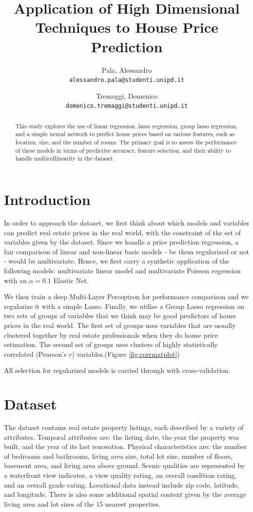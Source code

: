 \documentclass[a4paper, 9pt]{article}
\title{Application of High Dimensional Techniques to House Price Prediction}
\author{
  Pala, Alessandro\\
  \texttt{alessandro.pala@studenti.unipd.it}
  \and
  Tremaggi, Domenico\\
  \texttt{domenico.tremaggi@studenti.unipd.it}
}
\date{}
\begin{document}
\maketitle
\noindent
\begin{abstract}
 This study explores the use of linear regression, lasso regression, group lasso regression, and a simple neural network to predict house prices based on various features, such as location, size, and the number of rooms. The primary goal is to assess the performance of these models in terms of predictive accuracy, feature selection, and their ability to handle multicollinearity in the dataset.
\end{abstract}
\vspace{5pt}

\begin{multicols}{2}

\section{Introduction} \vspace{-7pt}
In order to approach the dataset, we first think about which models and variables can predict real estate prices in the real world, with the constraint of the set of variables given by the dataset. Since we handle a price prediction regression, a fair comparison of linear and non-linear basic models - be them regularized or not - would be multivariate. Hence, we first carry a synthetic application of the following models: multivariate linear model and multivariate Poisson regression with an $\alpha = 0.1$ Elastic Net.

We then train a deep Multi-Layer Perceptron for performance comparison and we regularize it with a simple Lasso.
Finally, we utilise a Group Lasso regression on two sets of groups of variables that we think may be good predictors of house prices in the real world. The first set of groups uses variables that are usually clustered together by real estate professionals when they do house price estimation. The second set of groups uses clusters of highly statistically correlated (Pearson's $r$) variables.(Figure \ref{fig:corrmatplot})

All selection for regularized models is carried through with cross-validation.

\section{Dataset} \vspace{-7pt}
The dataset contains real estate property listings, each described by a variety of attributes. Temporal attributes are: the listing date, the year the property was built, and the year of its last renovation. Physical characteristics are: the number of bedrooms and bathrooms, living area size, total lot size, number of floors, basement area, and living area above ground. Scenic qualities are represented by a waterfront view indicator, a view quality rating, an overall condition rating, and an overall grade rating. Locational data instead include zip code,  latitude, and longitude. There is also some additional spatial context given by the average living area and lot sizes of the 15 nearest properties.


\end{multicols}
\end{document}
